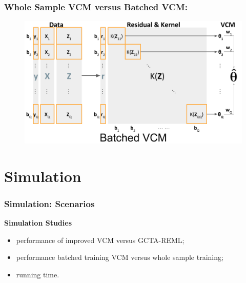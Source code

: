 \documentclass{beamer}
\begin{document}
\begin{frame}\frametitle{Whole Sample VCM versus Batched VCM:} %
  \begin{figure}\includegraphics[width=1\textwidth]{img/vcm_bat}\end{figure}
\end{frame}
\section{Simulation}
\begin{frame}
  \frametitle{Simulation: Scenarios} %
  \centering
  \Large{\textbf{Simulation Studies}}
  \normalsize
  \begin{itemize}
  \item performance of improved VCM versus GCTA-REML;
  \item performance batched training VCM versus whole sample training;
  \item running time.
  \end{itemize}
\end{frame}
\end{document}
